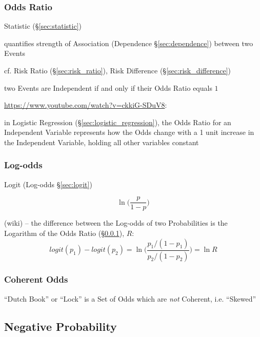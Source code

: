 \subsubsection{Odds Ratio}\label{sec:odds_ratio}

Statistic (\S\ref{sec:statistic})

quantifies strength of Association (Dependence \S\ref{sec:dependence}) between
two Events

\fist cf. Risk Ratio (\S\ref{sec:risk_ratio}), Risk Difference
(\S\ref{sec:risk_difference})

two Events are Independent if and only if their Odds Ratio equals $1$

\url{https://www.youtube.com/watch?v=ckkiG-SDuV8}:

in Logistic Regression (\S\ref{sec:logistic_regression}), the Odds Ratio for an
Independent Variable represents how the Odds change with a 1 unit increase in
the Independent Variable, holding all other variables constant



\subsubsection{Log-odds}\label{sec:log_odds}

Logit (Log-odds \S\ref{sec:logit})

\[
  \ln \Big(\frac{p}{1 - p}\Big)
\]

(wiki) --
the difference between the Log-odds of two Probabilities is the Logarithm
of the Odds Ratio (\S\ref{sec:odds_ratio}), $R$:
\[
  logit(p_1) - logit(p_2) = \ln\Big(\frac{p_1/(1 - p_1)}{p_2/(1 - p_2)}\Big)
    = \ln R
\]



\subsubsection{Coherent Odds}\label{sec:coherent_odds}

``Dutch Book'' or ``Lock'' is a Set of Odds which are \emph{not} Coherent, i.e.
``Skewed''



\subsection{Negative Probability}\label{sec:negative_probability}

